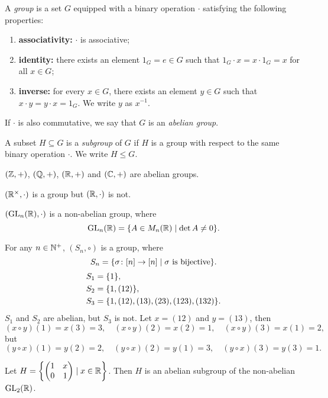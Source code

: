 \begin{definition}[Group] \label{def:group}
    A \emph{group} is a set $G$ equipped with a binary operation $\cdot$
    satisfying the following properties:
    \begin{enumerate}[label=\small(G\arabic*)]
        \item \textbf{associativity:} $\cdot$ is associative;
        \item \textbf{identity:} there exists an element $1_G = e \in G$
            such that $1_G \cdot x = x \cdot 1_G = x$ for all $x \in G$;
        \item \textbf{inverse:} for every $x \in G$, there exists an element
            $y \in G$ such that $x \cdot y = y \cdot x = 1_G$.
            We write $y$ as $x^{-1}$.
    \end{enumerate}

    If $\cdot$ is also commutative, we say that $G$ is an
    \emph{abelian group}.

    A subset $H \subseteq G$ is a \emph{subgroup} of $G$ if $H$ is a group
    with respect to the same binary operation $\cdot$.
    We write $H \le G$.
\end{definition}

\begin{examples}
    \item $(\mathbb{Z}, +)$, $(\mathbb{Q}, +)$, $(\mathbb{R}, +)$ and $(\mathbb{C}, +)$ are abelian groups.
    \item $(\mathbb{R}^\times, \cdot)$ is a group but $(\mathbb{R}, \cdot)$ is not.
    \item $(\operatorname{GL}_n(\mathbb{R}), \cdot)$ is a non-abelian group, where \[
        \operatorname{GL}_n(\mathbb{R}) = \{A \in M_n(\mathbb{R}) \mid \det A \neq 0\}.
    \]
    \item For any $n \in \mathbb{N}^+$, $(S_n, \circ)$ is a group, where \[
        S_n = \{\sigma\colon [n] \to [n]
                \mid \sigma \text{ is bijective}\}.
    \] \begin{align*}
        S_1 &= \{1\}, \\
        S_2 &= \{1, (12)\}, \\
        S_3 &= \{1, (12), (13), (23), (123), (132)\}.
    \end{align*}
    $S_1$ and $S_2$ are abelian, but $S_3$ is not.
    Let $x = (12)$ and $y = (13)$, then \[
        (x \circ y)(1) = x(3) = 3, \quad
        (x \circ y)(2) = x(2) = 1, \quad
        (x \circ y)(3) = x(1) = 2,
    \] but \[
        (y \circ x)(1) = y(2) = 2, \quad
        (y \circ x)(2) = y(1) = 3, \quad
        (y \circ x)(3) = y(3) = 1.
    \]
    \item Let $H = \set*{\begin{pmatrix}
        1 & x \\
        0 & 1
    \end{pmatrix} \mid x \in \R}$.
    Then $H$ is an abelian subgroup of the non-abelian $\operatorname{GL}_2(\mathbb{R})$.
\end{examples}

